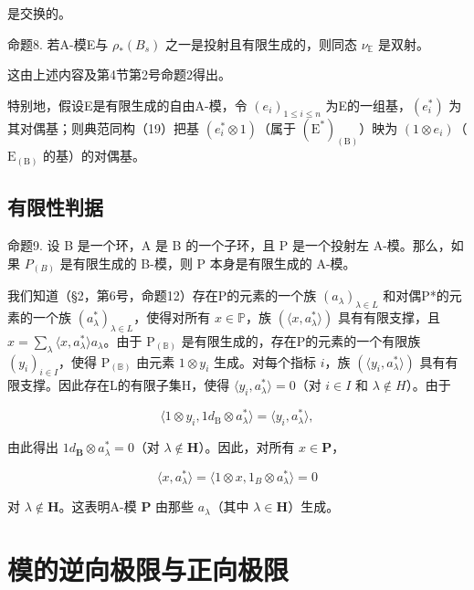 是交换的。

命题8. 若A-模E与 \(\rho_{*}(B_{s})\) 之一是投射且有限生成的，则同态 \(\nu_{\mathbb{E}}\) 是双射。

这由上述内容及第4节第2号命题2得出。

特别地，假设E是有限生成的自由A-模，令 \((e_{i})_{1\leqslant i\leqslant n}\) 为E的一组基，\((e_{i}^{*})\) 为其对偶基；则典范同构（19）把基 \((e_{i}^{*}\otimes1)\)（属于 \((\mathrm{E}^{*})_{(\mathrm{B})}\)）映为 \((1\otimes e_{i})\)（\(\mathrm{E}_{(\mathrm{B})}\) 的基）的对偶基。

\subsection{有限性判据}

命题9. 设 B 是一个环，A 是 B 的一个子环，且 P 是一个投射左 A-模。那么，如果 \(P_{(B)}\) 是有限生成的 B-模，则 P 本身是有限生成的 A-模。

我们知道（§2，第6号，命题12）存在P的元素的一个族 \((a_{\lambda})_{\lambda \in L}\) 和对偶P*的元素的一个族 \((a_{\lambda}^{*})_{\lambda \in L}\)，使得对所有 \(x \in \mathbb{P}\)，族 \((\langle x, a_{\lambda}^{*} \rangle)\) 具有有限支撑，且 \(x = \sum_{\lambda} \langle x, a_{\lambda}^{*} \rangle a_{\lambda}\)。由于 \(\mathrm{P}_{(\mathbb{B})}\) 是有限生成的，存在P的元素的一个有限族 \((y_{i})_{i \in I}\)，使得 \(\mathrm{P}_{(\mathbb{B})}\) 由元素 \(1 \otimes y_{i}\) 生成。对每个指标 \(i\)，族 \((\langle y_{i}, a_{\lambda}^{*} \rangle)\) 具有有限支撑。因此存在L的有限子集H，使得 \(\langle y_{i}, a_{\lambda}^{*} \rangle = 0\)（对 \(i \in I\) 和 \(\lambda \notin H\)）。由于

\[
\langle 1 \otimes y _ {i}, 1 d _ {\mathrm{B}} \otimes a _ {\lambda} ^ {*} \rangle = \langle y _ {i}, a _ {\lambda} ^ {*} \rangle ,
\]

由此得出 \(1d_{\mathbf{B}} \otimes a_{\lambda}^{*} = 0\)（对 \(\lambda \notin \mathbf{H}\)）。因此，对所有 \(x \in \mathbf{P}\)，

\[
\langle x, a _ {\lambda} ^ {*} \rangle = \langle 1 \otimes x, 1 _ {B} \otimes a _ {\lambda} ^ {*} \rangle = 0
\]

对 \(\lambda \notin \mathbf{H}\)。这表明A-模 \(\mathbf{P}\) 由那些 \(a_{\lambda}\)（其中 \(\lambda \in \mathbf{H}\)）生成。

\section{模的逆向极限与正向极限}

